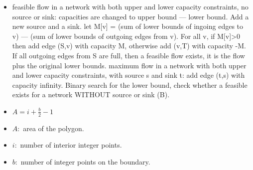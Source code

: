 \begin{itemize}
\item feasible flow in a network with both upper and lower capacity constraints, no source or sink: capacities are changed to upper bound — lower bound. Add a new source and a sink. let M[v] = (sum of lower bounds of ingoing edges to v) — (sum of lower bounds of outgoing edges from v). For all v, if M[v]>0 then add edge (S,v) with capacity M, otherwise add (v,T) with capacity -M. If all outgoing edges from S are full, then a feasible flow exists, it is the flow plus the original lower bounds.
maximum flow in a network with both upper and lower capacity constraints, with source s and sink t: add edge (t,s) with capacity infinity. Binary search for the lower bound, check whether a feasible exists for a network WITHOUT source or sink (B).
\end{itemize}
\begin{itemize}
  \item $A = i+\frac{b}{2}-1$
  \item $A:$ area of the polygon.
  \item $i:$ number of interior integer points.
  \item $b:$ number of integer points on the boundary.
\end{itemize}
